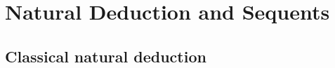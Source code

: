 \chapter{Natural Deduction and Sequents}
\label{ch:prop-deduction}

\section{Classical natural deduction}
\label{sec:prop-deduction-01}

